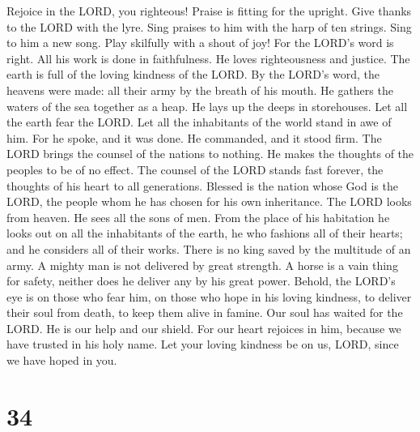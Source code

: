  Rejoice in the LORD, you righteous! Praise is fitting for
the upright.  Give thanks to the LORD with the lyre. Sing
praises to him with the harp of ten strings.  Sing to him
a new song. Play skilfully with a shout of joy!  For the
LORD's word is right. All his work is done in faithfulness.
 He loves righteousness and justice. The earth is full of
the loving kindness of the LORD.  By the LORD's word, the
heavens were made: all their army by the breath of his mouth.
 He gathers the waters of the sea together as a heap. He
lays up the deeps in storehouses.  Let all the earth fear
the LORD. Let all the inhabitants of the world stand in awe of him.
 For he spoke, and it was done. He commanded, and it stood
firm.  The LORD brings the counsel of the nations to
nothing. He makes the thoughts of the peoples to be of no effect.
 The counsel of the LORD stands fast forever, the
thoughts of his heart to all generations.  Blessed is the
nation whose God is the LORD, the people whom he has chosen for his own
inheritance.  The LORD looks from heaven. He sees all the
sons of men.  From the place of his habitation he looks
out on all the inhabitants of the earth,  he who fashions
all of their hearts; and he considers all of their works.
 There is no king saved by the multitude of an army. A
mighty man is not delivered by great strength.  A horse
is a vain thing for safety, neither does he deliver any by his great
power.  Behold, the LORD's eye is on those who fear him,
on those who hope in his loving kindness,  to deliver
their soul from death, to keep them alive in famine.  Our
soul has waited for the LORD. He is our help and our shield.
 For our heart rejoices in him, because we have trusted
in his holy name.  Let your loving kindness be on us,
LORD, since we have hoped in you.

\hypertarget{section-33}{%
\section{34}\label{section-33}}

